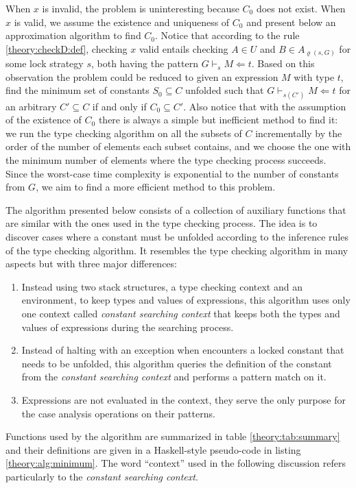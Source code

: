 When $x$ is invalid, the problem is uninteresting because $C_0$ does not exist. When $x$ is valid, we assume the existence and uniqueness of $C_0$ and present below an approximation algorithm to find $C_0$. Notice that according to the rule \ref{theory:checkD:def}, checking $x$ valid entails checking $A \in U$ and $B \in A_{\varrho(s,G)}$ for some lock strategy $s$, both having the pattern $G \vdash_s M \Leftarrow t$. Based on this observation the problem could be reduced to given an expression $M$ with type $t$, find the minimum set of constants $S_0 \subseteq C$ unfolded such that $G \vdash_{s(C')} M \Leftarrow t$ for an arbitrary $C' \subseteq C$ if and only if $C_0 \subseteq C'$. Also notice that with the assumption of the existence of $C_0$ there is always a simple but inefficient method to find it: we run the type checking algorithm on all the subsets of $C$ incrementally by the order of the number of elements each subset contains, and we choose the one with the minimum number of elements where the type checking process succeeds. Since the worst-case time complexity is exponential to the number of constants from $G$, we aim to find a more efficient method to this problem.

The algorithm presented below consists of a collection of auxiliary functions that are similar with the ones used in the type checking process. The idea is to discover cases where a constant must be unfolded according to the inference rules of the type checking algorithm. It resembles the type checking algorithm in many aspects but with three major differences:
\begin{enumerate}
\item Instead using two stack structures, a type checking context and an environment, to keep types and values of expressions, this algorithm uses only one context called \emph{constant searching context} that keeps both the types and values of expressions during the searching process.
\item Instead of halting with an exception when encounters a locked constant that needs to be unfolded, this algorithm queries the definition of the constant from the \emph{constant searching context} and performs a pattern match on it. 
\item Expressions are not evaluated in the context, they serve the only purpose for the case analysis operations on their patterns.
\end{enumerate}
Functions used by the algorithm are summarized in table \ref{theory:tab:summary} and their definitions are given in a Haskell-style pseudo-code in listing \ref{theory:alg:minimum}. The word ``context'' used in the following discussion refers particularly to the \emph{constant searching context}.


